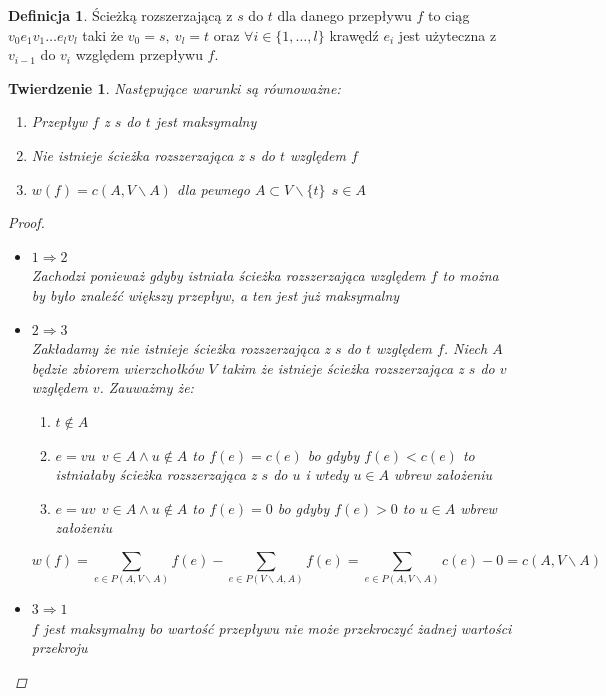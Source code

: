 \documentclass[12pt,a4paper]{article}
\newtheorem{tw}{Twierdzenie}
\theoremstyle{definition}
\newtheorem{df}{Definicja}
\begin{document}
\begin{df} 
Ścieżką rozszerzającą z $s$ do $t$ dla danego przepływu $f$ to ciąg $v_0e_1v_1\dots e_lv_l$ taki że $v_0 = s, ~ v_l=t$ oraz $\forall i\in \{1,\dots , l\}$ krawędź $e_i$ jest użyteczna z $v_{i-1}$ do $v_i$ względem przepływu $f$.
\end{df}



\begin{tw}
Następujące warunki są równoważne:
\begin{enumerate}
	\item Przepływ $f$ z $s$ do $t$ jest maksymalny\label{warunek:1}
	\item Nie istnieje ścieżka rozszerzająca z $s$ do $t$ względem $f$
	\item $w(f) = c(A, V \smallsetminus A)$ dla pewnego $A\subset V\smallsetminus \{t\}~~s\in A$
\end{enumerate}
\begin{proof}
\begin{itemize}
	\item $1\Rightarrow 2$\\
	Zachodzi ponieważ gdyby istniała ścieżka rozszerzająca względem $f$ to można by było znaleźć większy przepływ, a ten jest już maksymalny
	\item $2\Rightarrow 3$\\
	Zakładamy że nie istnieje ścieżka rozszerzająca z $s$ do $t$ względem $f$. Niech $A$ będzie zbiorem wierzchołków $V$ takim że istnieje ścieżka rozszerzająca z $s$ do $v$ względem $v$. Zauważmy że:
	\begin{enumerate}
		\item $t\not\in A$
		\item $e = vu ~~ v\in A \wedge u\not\in A$ to $f(e) = c(e)$ bo gdyby $f(e) <c(e)$ to istniałaby ścieżka rozszerzająca z $s$ do $u$ i wtedy $u\in A$ wbrew założeniu
		\item $e = uv ~~ v\in A \wedge u\not\in A$ to $f(e) = 0$ bo gdyby $f(e) > 0 $ to $u\in A$ wbrew założeniu
	\end{enumerate}
	$$w(f) = \sum\limits_{e\in P(A, V\smallsetminus A)}f(e) - \sum\limits_{e\in P(V \smallsetminus A, A)}f(e) = \sum\limits_{e\in P(A, V\smallsetminus A)}c(e) - 0 = c(A, V\smallsetminus A)$$
	\item $3 \Rightarrow 1$\\
	$f$ jest maksymalny bo wartość przepływu nie może przekroczyć żadnej wartości przekroju
\end{itemize}
\end{proof}
\end{tw}
\end{document}
